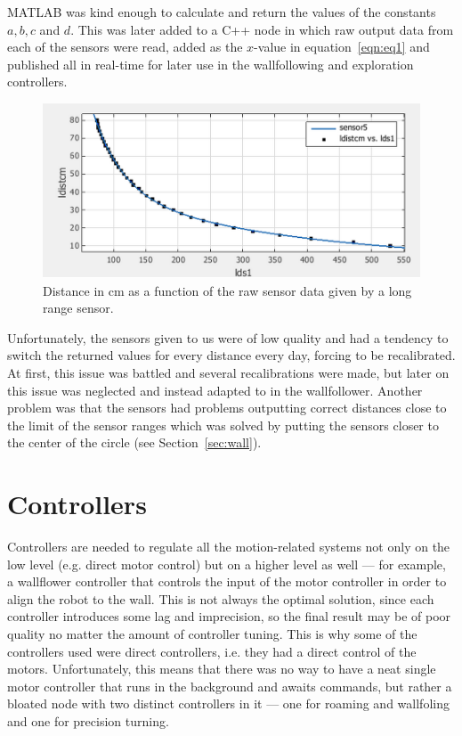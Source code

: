 \documentclass[10pt,a4paper,twocolumn]{article}
\begin{document}
MATLAB was kind enough to calculate and return the values of the constants $a,
b, c$ and $d$. This was later added to a C++ node in which raw output data from
each of the sensors were read, added as the $x$-value in equation~\ref{eqn:eq1}
and published all in real-time for later use in the wallfollowing and
exploration controllers.

\begin{figure}
  \centering
  \includegraphics[width=\linewidth]{images/sensorcalib.png}  
  \caption{Distance in cm as a function of the raw sensor data given by a long range sensor.}
  \label{fig:sensorcalib}
\end{figure}

Unfortunately, the sensors given to us were of low quality and had a tendency to
switch the returned values for every distance every day, forcing to be
recalibrated. At first, this issue was battled and several recalibrations were
made, but later on this issue was neglected and instead adapted to in the
wallfollower. Another problem was that the sensors had problems outputting
correct distances close to the limit of the sensor ranges which was solved by
putting the sensors closer to the center of the circle (see Section~\ref{sec:wall}).

\section{Controllers}
Controllers are needed to regulate all the motion-related systems not only on
the low level (e.g. direct motor control) but on a higher level as well --- for
example, a wallflower controller that controls the input of the motor controller
in order to align the robot to the wall. This is not always the optimal
solution, since each controller introduces some lag and imprecision, so the
final result may be of poor quality no matter the amount of controller tuning.
This is why some of the controllers used were direct controllers, i.e. they had
a direct control of the motors. Unfortunately, this means that there was no way
to have a neat single motor controller that runs in the background and awaits
commands, but rather a bloated node with two distinct controllers in it --- one
for roaming and wallfoling and one for precision turning.
\end{document}
